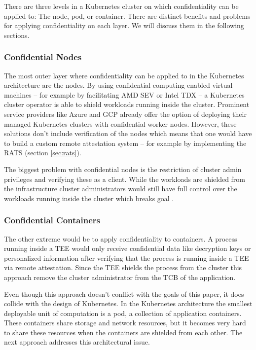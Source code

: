 There are three levels in a Kubernetes cluster on which confidentiality can be
applied to: The node, pod, or container. There are distinct benefits and
problems for applying confidentiality on each layer. We will discuss them in the
following sections.

\subsubsection{Confidential Nodes}

The most outer layer where confidentiality can be applied to in the Kubernetes
architecture are the nodes. By using confidential computing enabled virtual
machines -- for example by facilitating AMD SEV or Intel TDX -- a Kubernetes
cluster operator is able to shield workloads running inside the cluster.
Prominent service providers like Azure and GCP already offer the option of
deploying their managed Kubernetes clusters with confidential worker nodes.
However, these solutions don't include verification of the nodes which means
that one would have to build a custom remote attestation system -- for example
by implementing the RATS (section \ref{sec:rats}).

The biggest problem with confidential nodes is the restriction of cluster admin
privileges and verifying these as a client. While the workloads are shielded
from the infrastructure cluster administrators would still have full control
over the workloads running inside the cluster which breaks goal
.

\subsubsection{Confidential Containers}

The other extreme would be to apply confidentiality to containers. A process
running inside a TEE would only receive confidential data like decryption keys
or personalized information after verifying that the process is running inside a
TEE via remote attestation. Since the TEE shields the process from the cluster
this approach remove the cluster administrator from the TCB of the application.

Even though this approach doesn't conflict with the goals of this paper, it does
collide with the design of Kubernetes. In the Kubernetes architecture the
smallest deployable unit of computation is a pod, a collection of application
containers. These containers share storage and network resources, but it becomes
very hard to share these resources when the containers are shielded from each
other. The next approach addresses this architectural issue.

